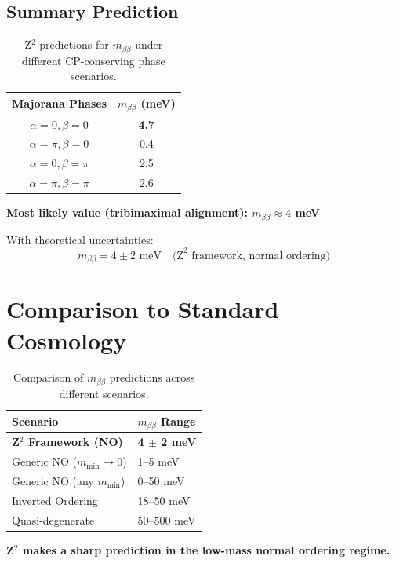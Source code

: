 \documentclass[12pt,a4paper]{article}
\begin{document}
\subsection{Summary Prediction}

\begin{table}[h]
\centering
\begin{tabular}{@{}cc@{}}
\toprule
Majorana Phases & $m_{\beta\beta}$ (meV) \\
\midrule
$\alpha = 0, \beta = 0$ & \textbf{4.7} \\
$\alpha = \pi, \beta = 0$ & 0.4 \\
$\alpha = 0, \beta = \pi$ & 2.5 \\
$\alpha = \pi, \beta = \pi$ & 2.6 \\
\bottomrule
\end{tabular}
\caption{Z$^2$ predictions for $m_{\beta\beta}$ under different CP-conserving phase scenarios.}
\end{table}

\textbf{Most likely value (tribimaximal alignment): $m_{\beta\beta} \approx 4$ meV}

With theoretical uncertainties:
\begin{equation}
\boxed{m_{\beta\beta} = 4 \pm 2 \text{ meV} \quad \text{(Z}^2 \text{ framework, normal ordering)}}
\end{equation}

\section{Comparison to Standard Cosmology}

\begin{table}[h]
\centering
\begin{tabular}{@{}ll@{}}
\toprule
Scenario & $m_{\beta\beta}$ Range \\
\midrule
\textbf{Z$^2$ Framework (NO)} & \textbf{4 $\pm$ 2 meV} \\
Generic NO ($m_{\min} \rightarrow 0$) & 1--5 meV \\
Generic NO (any $m_{\min}$) & 0--50 meV \\
Inverted Ordering & 18--50 meV \\
Quasi-degenerate & 50--500 meV \\
\bottomrule
\end{tabular}
\caption{Comparison of $m_{\beta\beta}$ predictions across different scenarios.}
\end{table}

\textbf{Z$^2$ makes a sharp prediction in the low-mass normal ordering regime.}
\end{document}
